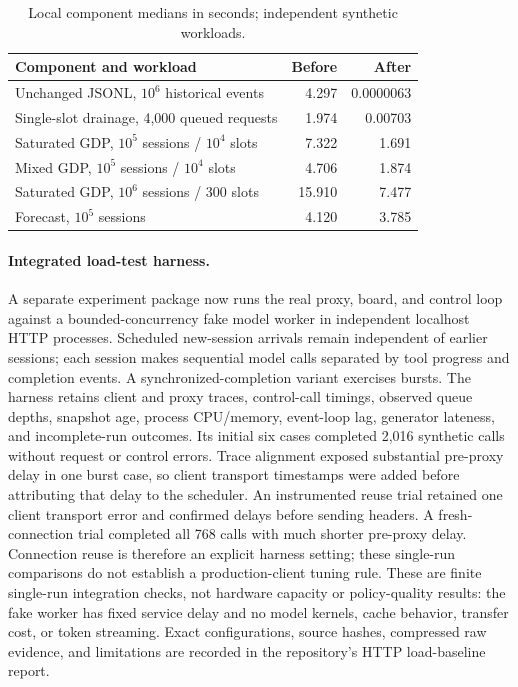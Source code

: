 \begin{table}[!htbp]
\centering
\small
\caption{Local component medians in seconds; independent synthetic workloads.}
\label{tab:control-cpu}
\begin{tabular}{@{}lrr@{}}
\toprule
Component and workload & Before & After \\
\midrule
Unchanged JSONL, $10^6$ historical events & 4.297 & 0.0000063 \\
Single-slot drainage, 4,000 queued requests & 1.974 & 0.00703 \\
Saturated GDP, $10^5$ sessions / $10^4$ slots & 7.322 & 1.691 \\
Mixed GDP, $10^5$ sessions / $10^4$ slots & 4.706 & 1.874 \\
Saturated GDP, $10^6$ sessions / 300 slots & 15.910 & 7.477 \\
Forecast, $10^5$ sessions & 4.120 & 3.785 \\
\bottomrule
\end{tabular}
\end{table}

\paragraph{Integrated load-test harness.}
A separate experiment package now runs the real proxy, board, and control loop
against a bounded-concurrency fake model worker in independent localhost HTTP
processes. Scheduled new-session arrivals remain independent of earlier sessions;
each session makes sequential model calls separated by tool progress and completion
events. A synchronized-completion variant exercises bursts. The harness retains
client and proxy traces, control-call timings, observed queue depths, snapshot age,
process CPU/memory, event-loop lag, generator lateness, and incomplete-run outcomes.
Its initial six cases completed 2,016 synthetic calls without request or control
errors. Trace alignment exposed substantial pre-proxy delay in one burst case,
so client transport timestamps were added before attributing that delay to the
scheduler. An instrumented reuse trial retained one client transport error and
confirmed delays before sending headers. A fresh-connection trial completed all
768 calls with much shorter pre-proxy delay. Connection reuse is therefore an
explicit harness setting; these single-run comparisons do not establish a
production-client tuning rule. These are finite single-run integration checks, not hardware capacity
or policy-quality results: the fake worker has fixed service delay and no model
kernels, cache behavior, transfer cost, or token streaming. Exact configurations,
source hashes, compressed raw evidence, and limitations are recorded in the
repository's HTTP load-baseline report.

